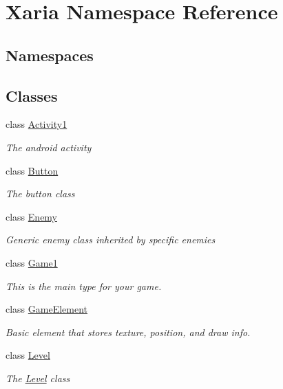 \hypertarget{namespaceXaria}{}\section{Xaria Namespace Reference}
\label{namespaceXaria}
\subsection*{Namespaces}
\begin{DoxyCompactItemize}
\end{DoxyCompactItemize}
\subsection*{Classes}
\begin{DoxyCompactItemize}
\item 
class \hyperlink{classXaria_1_1Activity1}{Activity1}
\begin{DoxyCompactList}\small\item\em The android activity \end{DoxyCompactList}\item 
class \hyperlink{classXaria_1_1Button}{Button}
\begin{DoxyCompactList}\small\item\em The button class \end{DoxyCompactList}\item 
class \hyperlink{classXaria_1_1Enemy}{Enemy}
\begin{DoxyCompactList}\small\item\em Generic enemy class inherited by specific enemies \end{DoxyCompactList}\item 
class \hyperlink{classXaria_1_1Game1}{Game1}
\begin{DoxyCompactList}\small\item\em This is the main type for your game. \end{DoxyCompactList}\item 
class \hyperlink{classXaria_1_1GameElement}{Game\+Element}
\begin{DoxyCompactList}\small\item\em Basic element that stores texture, position, and draw info. \end{DoxyCompactList}\item 
class \hyperlink{classXaria_1_1Level}{Level}
\begin{DoxyCompactList}\small\item\em The \hyperlink{classXaria_1_1Level}{Level} class \end{DoxyCompactList}\item 

\end{DoxyCompactItemize}
